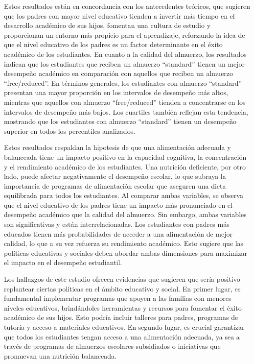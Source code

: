\documentclass[
]{article}
\begin{document}
Estos resultados están en concordancia con los antecedentes teóricos,
que sugieren que los padres con mayor nivel educativo tienden a invertir
más tiempo en el desarrollo académico de sus hijos, fomentan una cultura
de estudio y proporcionan un entorno más propicio para el aprendizaje,
reforzando la idea de que el nivel educativo de los padres es un factor
determinante en el éxito académico de los estudiantes. En cuanto a la
calidad del almuerzo, los resultados indican que los estudiantes que
reciben un almuerzo ``standard'' tienen un mejor desempeño académico en
comparación con aquellos que reciben un almuerzo ``free/reduced''. En
términos generales, los estudiantes con almuerzo ``standard'' presentan
una mayor proporción en los intervalos de desempeño más altos, mientras
que aquellos con almuerzo ``free/reduced'' tienden a concentrarse en los
intervalos de desempeño más bajos. Los cuartiles también reflejan esta
tendencia, mostrando que los estudiantes con almuerzo ``standard''
tienen un desempeño superior en todos los percentiles analizados.

Estos resultados respaldan la hipotesis de que una alimentación adecuada
y balanceada tiene un impacto positivo en la capacidad cognitiva, la
concentración y el rendimiento académico de los estudiantes. Una
nutrición deficiente, por otro lado, puede afectar negativamente el
desempeño escolar, lo que subraya la importancia de programas de
alimentación escolar que aseguren una dieta equilibrada para todos los
estudiantes. Al comparar ambas variables, se observa que el nivel
educativo de los padres tiene un impacto más pronunciado en el desempeño
académico que la calidad del almuerzo. Sin embargo, ambas variables son
significativas y están interrelacionadas. Los estudiantes con padres más
educados tienen más probabilidades de acceder a una alimentación de
mejor calidad, lo que a su vez refuerza su rendimiento académico. Esto
sugiere que las políticas educativas y sociales deben abordar ambas
dimensiones para maximizar el impacto en el desempeño estudiantil.

Los hallazgos de este estudio ofrecen evidencias que sugieren que sería
positivo replantear ciertas políticas en el ámbito educativo y social.
En primer lugar, es fundamental implementar programas que apoyen a las
familias con menores niveles educativos, brindándoles herramientas y
recursos para fomentar el éxito académico de sus hijos. Esto podría
incluir talleres para padres, programas de tutoría y acceso a materiales
educativos. En segundo lugar, es crucial garantizar que todos los
estudiantes tengan acceso a una alimentación adecuada, ya sea a través
de programas de almuerzos escolares subsidiados o iniciativas que
promuevan una nutrición balanceada.
\end{document}
